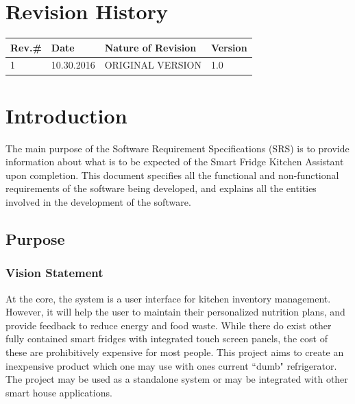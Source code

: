\setcounter{tocdepth}{2}
\titleformat{\subsubsection}[runin]
{\normalfont\normalsize\bfseries}{\thesubsubsection}{1em}{}


\pagestyle{empty} %

\titleGM %
\tableofcontents

\section*{Revision History}
{\ttfamily\begin{center}
		\begin{tabular*}{\textwidth}{ m{4em} m{5em} m{25em} m{4em}  }		
			\toprule			
			Rev.\# & Date & Nature of Revision & Version \\
			\bottomrule
			\toprule
			1 & 10.30.2016 & ORIGINAL VERSION & 1.0\\
			
			\hline		
		\end{tabular*}
	\end{center}
}
\pagebreak

\section{Introduction}
The main purpose of the Software Requirement Specifications (SRS) is to provide information about what is to be expected of the Smart Fridge Kitchen Assistant upon completion. This document specifies all the functional and non-functional requirements of the software being developed, and explains all the entities involved in the development of the software.

\subsection{Purpose}
\subsubsection{Vision Statement} At the core, the system is a user interface for kitchen inventory management. However, it will help the user to maintain their personalized nutrition plans, and provide feedback to reduce energy and food waste. While there do exist other fully contained smart fridges with integrated touch screen panels, the cost of these are prohibitively expensive for most people. This project aims to create an inexpensive product which one may use with ones current ``dumb" refrigerator. The project may be used as a standalone system or may be integrated with other smart house applications. 
